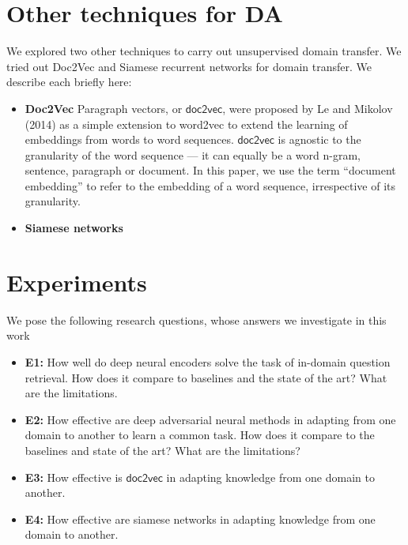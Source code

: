\documentclass{sigkddExp}
\begin{document}
\section{Other techniques for DA}
\label{other_techniques}
We explored two other techniques to carry out unsupervised domain transfer. We tried out Doc2Vec \cite{doc2vec1} and Siamese recurrent networks \cite{siamese} for domain transfer. We describe each briefly here:

\begin{itemize}[topsep=0pt,itemsep=-1ex,partopsep=1ex,parsep=1ex]
\item \textbf{Doc2Vec} Paragraph vectors, or $\mathsf{doc2vec}$, were proposed by Le and Mikolov (2014) as a simple extension to word2vec to extend the learning of embeddings from words to word sequences. $\mathsf{doc2vec}$ is agnostic to the  granularity of the word sequence — it can equally be a word n-gram, sentence, paragraph or document. In this paper, we use the term ``document embedding'' to refer to the embedding of a word sequence, irrespective of its granularity.

\item \textbf{Siamese networks} 

\end{itemize}

\section{Experiments}
\label{experiments}
We pose the following research questions, whose answers we investigate in this work
\begin{itemize}[topsep=0pt,itemsep=-1ex,partopsep=1ex,parsep=1ex]
\item \textbf{E1:} How well do deep neural encoders solve the task of in-domain question retrieval. How does it compare to baselines and the state of the art? What are the limitations.
\item \textbf{E2:} How effective are deep adversarial neural methods in adapting from one domain to another to learn a common task. How does it compare to the baselines and state of the art? What are the limitations?
\item \textbf{E3:} How effective is $\mathsf{doc2vec}$ in adapting knowledge from one domain to another.
\item \textbf{E4:} How effective are siamese networks in adapting knowledge from one domain to another.
\end{itemize}
\end{document}
